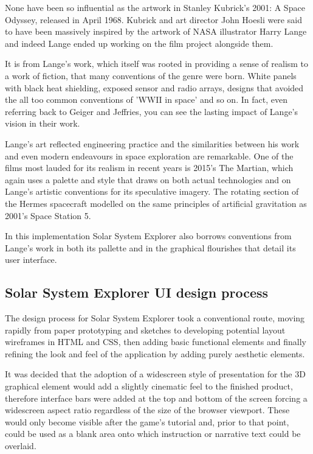 \documentclass[twoside]{bhamthesis}
\begin{document}
None have been so influential as the artwork in Stanley Kubrick's 2001: A Space Odyssey, released in April 1968. Kubrick and art director John Hoesli were said to have been massively inspired by the artwork of  NASA illustrator Harry Lange \cite{sinclair_man_2016} and indeed Lange ended up working on the film project alongside them.

It is from Lange's work, which itself was rooted in providing a sense of realism to a work of fiction, that many conventions of the genre were born. White panels with black heat shielding, exposed sensor and radio arrays, designs that avoided the all too common conventions of 'WWII in space' and so on. In fact, even referring back to Geiger and Jeffries, you can see the lasting impact of Lange's vision in their work. 

Lange's art reflected engineering practice and the similarities between his work and even modern endeavours in space exploration are remarkable. One of the films most lauded for its realism in recent years is 2015's The Martian, which again uses a palette and style that draws on both actual technologies and on Lange's artistic conventions for its speculative imagery. The rotating section of the Hermes spacecraft modelled on the same principles of artificial gravitation as 2001's Space Station 5.

In this implementation Solar System Explorer also borrows conventions from Lange's work in both its pallette and in the graphical flourishes that detail its user interface.

\subsection{Solar System Explorer UI design process}

The design process for Solar System Explorer took a conventional route, moving rapidly from paper prototyping and sketches to developing potential layout wireframes in HTML and CSS, then adding basic functional elements and finally refining the look and feel of the application by adding purely aesthetic elements.

It was decided that the adoption of a widescreen style of presentation for the 3D graphical element would add a slightly cinematic feel to the finished product, therefore interface bars were added at the top and bottom of the screen forcing a widescreen aspect ratio regardless of the size of the browser viewport. These would only become visible after the game's tutorial and, prior to that point, could be used as a blank area onto which instruction or narrative text could be overlaid.
\end{document}
